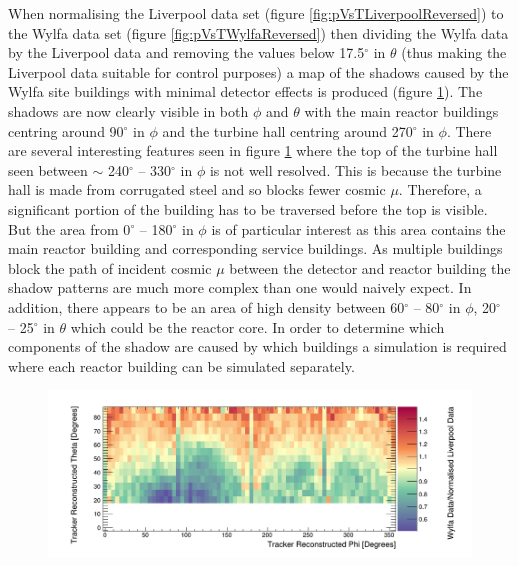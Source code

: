 When normalising the Liverpool data set (figure \ref{fig:pVsTLiverpoolReversed}) to the Wylfa data set (figure \ref{fig:pVsTWylfaReversed}) then dividing the Wylfa data by the Liverpool data and removing the values below 17.5$^\circ$ in $\theta$ (thus making the Liverpool data suitable for control purposes) a map of the shadows caused by the Wylfa site buildings with minimal detector effects is produced (figure \ref{fig:measuredTrackerReconNoLines}). The shadows are now clearly visible in both $\phi$ and $\theta$ with the main reactor buildings centring around 90$^\circ$ in $\phi$ and the turbine hall centring around 270$^\circ$ in $\phi$. There are several interesting features seen in figure \ref{fig:measuredTrackerReconNoLines} where the top of the turbine hall seen between $\sim$ 240$^\circ$ -- 330$^\circ$ in $\phi$ is not well resolved. This is because the turbine hall is made from corrugated steel and so blocks fewer cosmic $\mu$. Therefore, a significant portion of the building has to be traversed before the top is visible. But the area from 0$^\circ$ -- 180$^\circ$ in $\phi$ is of particular interest as this area contains the main reactor building and corresponding service buildings. As multiple buildings block the path of incident cosmic $\mu$ between the detector and reactor building the shadow patterns are much more complex than one would naively expect. In addition, there appears to be an area of high density between 60$^\circ$ -- 80$^\circ$ in $\phi$, 20$^\circ$ -- 25$^\circ$ in $\theta$ which could be the reactor core. In order to determine which components of the shadow are caused by which buildings a simulation is required where each reactor building can be simulated separately.

\begin{figure}[!h]
 \centering
 \includegraphics[width=\linewidth]{Chapter5/Figs/wylfaRasterNew/measuredTrackerReconNoLines.png}
 \label{fig:measuredTrackerReconNoLines}
\end{figure}

